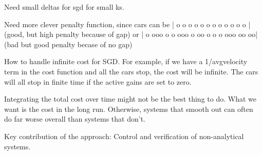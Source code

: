 \documentclass[10pt]{article}
\begin{document}
\begin{multicols}{2}
Need small deltas for sgd for small ks.

Need more clever penalty function, since cars can be | o o o o o o o o o           o o o | (good, but high penalty because of gap) or | o ooo o o ooo o oo o o o ooo oo  oo| (bad but good penalty becase of no gap)

How to handle infinite cost for SGD. For example, if we have a 1/avgvelocity term in the cost function and all the cars stop, the cost will be infinite. The cars will all stop in finite time if the active gains are set to zero.

Integrating the total cost over time might not be the best thing to do. What we want is the cost in the long run. Otherwise, systems that smooth out can often do far worse overall than systems that don't.

Key contribution of the approach: Control and verification of non-analytical systems.

\end{multicols}
\end{document}
